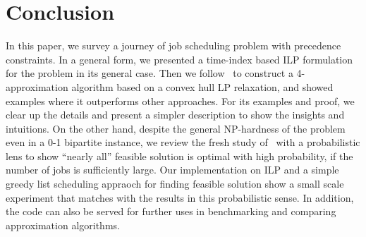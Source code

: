 \section{Conclusion} \label{s:conclusion}
In this paper, we survey a journey of job scheduling problem with precedence
constraints. In a general form, we presented a time-index based ILP formulation
for the problem in its general case. Then we
follow~\cite{queyranne2006approximation} to construct a 4-approximation
algorithm based on a convex hull LP relaxation, and showed examples where it
outperforms other approaches. For its examples and proof, we clear up the
details and present a simpler description to show the insights and intuitions.
On the other hand, despite the general NP-hardness of the problem even in a 0-1
bipartite instance, we review the fresh study of~\cite{schulz2011near} with a
probabilistic lens to show ``nearly all'' feasible solution is optimal with high
probability, if the number of jobs is sufficiently large. Our implementation on
ILP and a simple greedy list scheduling appraoch for finding feasible solution
show a small scale experiment that matches with the results in this
probabilistic sense. In addition, the code can also be served for further uses
in benchmarking and comparing approximation algorithms. 
